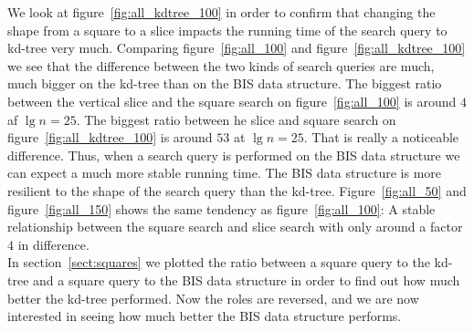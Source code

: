 We look at figure~\ref{fig:all_kdtree_100} in order to confirm that changing the shape from a square to a slice impacts the running time of the search query to kd-tree very much. Comparing figure~\ref{fig:all_100} and figure~\ref{fig:all_kdtree_100} we see that the difference between the two kinds of search queries are much, much bigger on the kd-tree than on the BIS data structure. The biggest ratio between the vertical slice and the square search on figure~\ref{fig:all_100} is around $4$ af $\lg n = 25$. The biggest ratio between he slice and square search on figure~\ref{fig:all_kdtree_100} is around $53$ at $\lg n = 25$. That is really a noticeable difference. Thus, when a search query is performed on the BIS data structure we can expect a much more stable running time. The BIS data structure is more resilient to the shape of the search query than the kd-tree. Figure~\ref{fig:all_50} and figure~\ref{fig:all_150} shows the same tendency as figure~\ref{fig:all_100}: A stable relationship between the square search and slice search with only around a factor $4$ in difference. \\

In section~\ref{sect:squares} we plotted the ratio between a square query to the kd-tree and a square query to the BIS data structure in order to find out how much better the kd-tree performed. Now the roles are reversed, and we are now interested in seeing how much better the BIS data structure performs. 


